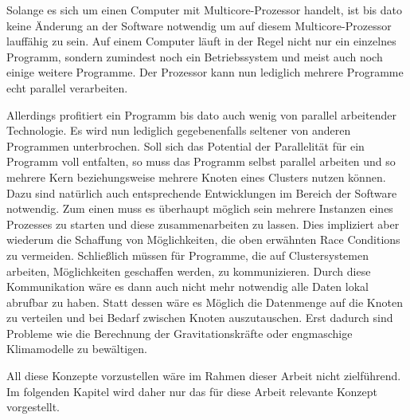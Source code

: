       Solange es sich um einen Computer mit Multicore-Prozessor handelt, ist bis dato keine Änderung an der Software notwendig um auf diesem Multicore-Prozessor lauffähig zu sein. 
      Auf einem Computer läuft in der Regel nicht nur ein einzelnes Programm, sondern zumindest noch ein Betriebssystem und meist auch noch einige weitere Programme.
      Der Prozessor kann nun lediglich mehrere Programme echt parallel verarbeiten.
      
      Allerdings profitiert ein Programm bis dato auch wenig von parallel arbeitender Technologie. Es wird nun lediglich gegebenenfalls seltener von anderen Programmen unterbrochen.
      Soll sich das Potential der Parallelität für ein Programm voll entfalten, so muss das Programm selbst parallel arbeiten und so mehrere Kern beziehungsweise mehrere Knoten eines 
      Clusters nutzen können. Dazu sind natürlich auch entsprechende Entwicklungen im Bereich der Software notwendig. Zum einen muss es überhaupt möglich sein mehrere Instanzen eines 
      Prozesses zu starten und diese zusammenarbeiten zu lassen. Dies impliziert aber wiederum die Schaffung von Möglichkeiten, die oben erwähnten Race Conditions zu vermeiden. Schließlich 
      müssen für Programme, die auf Clustersystemen arbeiten, Möglichkeiten geschaffen werden, zu kommunizieren. Durch diese Kommunikation wäre es dann auch nicht mehr notwendig alle Daten
      lokal abrufbar zu haben. Statt dessen wäre es Möglich die Datenmenge auf die Knoten zu verteilen und bei Bedarf zwischen Knoten auszutauschen. Erst dadurch sind Probleme wie die 
      Berechnung der Gravitationskräfte oder engmaschige Klimamodelle zu bewältigen.
      
      All diese Konzepte vorzustellen wäre im Rahmen dieser Arbeit nicht zielführend. Im folgenden Kapitel wird daher nur das für diese Arbeit relevante Konzept vorgestellt.
      
